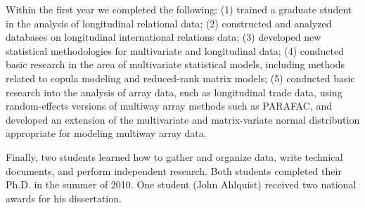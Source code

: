 \documentclass[pdftex,12pt,fullpage,oneside]{amsart}
\begin{document}
Within the first year we completed the following: (1) trained a
graduate student in the analysis of longitudinal relational data; (2)
constructed and analyzed databases on longitudinal international
relations data; (3) developed new statistical methodologies for
multivariate and longitudinal data; (4) conducted basic research in
the area of multivariate statistical models, including methods related
to copula modeling and reduced-rank matrix models; (5) conducted basic
research into the analysis of array data, such as longitudinal trade
data, using random-effects versions of multiway array methods such as
PARAFAC, and developed an extension of the multivariate and
matrix-variate normal distribution appropriate for modeling multiway
array data.

Finally, two students learned how to gather and organize data, write
technical documents, and perform independent research. Both students
completed their Ph.D. in the summer of 2010. One student (John
Ahlquist) received two national awards for his dissertation.
\end{document}
